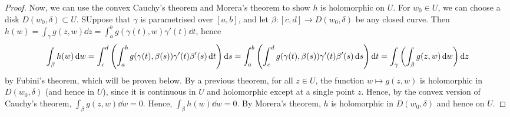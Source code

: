 \begin{proof}
	Now, we can use the convex Cauchy's theorem and Morera's theorem to show \( h \) is holomorphic on \( U \).
	For \( w_0 \in U \), we can choose a disk \( D(w_0, \delta) \subset U \).
	SUppose that \( \gamma \) is parametrised over \( [a,b] \), and let \( \beta \colon [c,d] \to D(w_0,\delta) \) be any closed curve.
	Then \( h(w) = \int_\gamma g(z,w) \dd{z} = \int_a^b g(\gamma(t),w) \gamma'(t) \dd{t} \), hence
	\[ \int_\beta h(w) \dd{w} = \int_c^d \qty(\int_a^b g(\gamma(t),\beta(s))\gamma'(t)\beta'(s) \dd{t})\dd{s} = \int_a^b \qty(\int_c^d g(\gamma(t),\beta(s))\gamma'(t)\beta'(s) \dd{s})\dd{t} = \int_\gamma \qty(\int_\beta g(z,w) \dd{w}) \dd{z} \]
	by Fubini's theorem, which will be proven below.
	By a previous theorem, for all \( z \in U \), the function \( w \mapsto g(z,w) \) is holomorphic in \( D(w_0, \delta) \) (and hence in \( U \)), since it is continuous in \( U \) and holomorphic except at a single point \( z \).
	Hence, by the convex version of Cauchy's theorem, \( \int_\beta g(z,w) \dd{w} = 0 \).
	Hence, \( \int_\beta h(w) \dd{w} = 0 \).
	By Morera's theorem, \( h \) is holomorphic in \( D(w_0, \delta) \) and hence on \( U \).
\end{proof}
